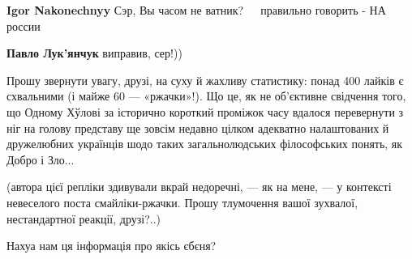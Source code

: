\begin{itemize}
\begin{itemize}
\textbf{Igor Nakonechnyy} Сэр, Вы часом не ватник? 🤣🤣🤣 правильно говорить - НА россии 🤣🤣🤣

 
\textbf{Павло Лук'янчук} виправив, сер!))
\end{itemize}

 

Прошу звернути увагу, друзі, на суху й жахливу статистику: понад 400 лайків є
схвальними (і майже 60 — «ржачки»!). Що це, як не об'єктивне свідчення того, що
Одному Хўлові за історично короткий проміжок часу вдалося перевернути з ніг на
голову представу ще зовсім недавно цілком адекватно налаштованих й дружелюбних
українців шодо таких загальнолюдських філософських понять, як Добро і Зло...

\begin{itemize}
 

(автора цієї репліки здивували вкрай недоречні, — як на мене, — у контексті
невеселого поста смайліки-ржачки. Прошу тлумочення вашої зухвалої,
нестандартної реакції, друзі?..)

\end{itemize}

 
Нахуа нам ця інформація про якісь єбєня?

\begin{itemize}
 

\end{itemize}
\end{itemize}
